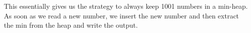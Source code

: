 This essentially gives us the strategy to always keep 1001 numbers in
a min-heap. As soon as we read a new number, we insert the new
number and then extract the min
from the heap and write the output.

\begin{comment}
Ian's solution

There is a stream of numbers arriving as an input such that each number is at most 1000 
positions away from its correctly sorted position. Write an algorithm that outputs 
correctly sorted numbers but uses only $O(1)$ storage.

The problem is essentially that of buffering a constant number of input items, $m$ (in this 
case, $m = 1000$). A good data-structure to use for this (assuming ascending order) would be 
a min-heap. If we use a heap, each insert would take $\log m$ time. Since $m$ is a constant, this is really a constant time operation.

Initially we would need to buffer $(m \log m)$ records. For each additional item that comes in 
via the stream, we first insert it into the heap ($O(lg m)$.
Then we pop the min item off the heap. All the heap operations would be constant time with respect to $n$ since we are treating $m$ as a constant.

Here is a Python implementation. First, we have to simulate an ``almost sorted'' stream which we can do with this Python function:

\begin{verbatim}
import random
import heapq
import math
 
# Create an almost-sorted array of numbers
def GetInputStream(n, m):
    ordered = range(0, n)
    for i in range(0, n):
        ordered[i] = random.randint(0, n)
    list.sort(ordered)
    permuted = range(0, n)
    for i in range(0, n):
        permuted[i] = None
 
    # for each element, put it into a spot that's +/- m away 
    # from its original spot, checking first to see that 
    # that spot is available
    for x in range(n):
        moved = False
        # first, see if I am forced into a slot by there being 
	# an opening that is m lower than me
        if x >= m and permuted[(x - m)] == None:
            permuted[(x - m)] = ordered[x]
            moved = True
        else:
            while moved == False:
                newpos = random.randint(max(x - m, 0), min(x + m, n - 1))
                if permuted[newpos] == None:
                    permuted[newpos] = ordered[x]
                    moved = True
 

\end{comment}
